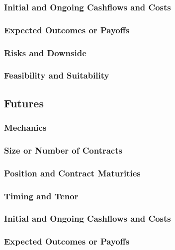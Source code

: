 \documentclass[11pt, a4paper, british]{article}
\begin{document}
\subsubsection{Initial and Ongoing Cashflows and Costs}

\subsubsection{Expected Outcomes or Payoffs}

\subsubsection{Risks and Downside}

\subsubsection{Feasibility and Suitability}

\newpage

\subsection{Futures}

\subsubsection{Mechanics}

\subsubsection{Size or Number of Contracts}

\subsubsection{Position and Contract Maturities}

\subsubsection{Timing and Tenor}

\subsubsection{Initial and Ongoing Cashflows and Costs}

\subsubsection{Expected Outcomes or Payoffs}
\end{document}
